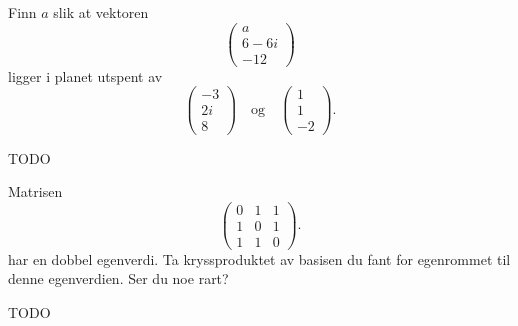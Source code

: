 \begin{oppgave}
Finn $a$ slik at vektoren 
\[
\begin{pmatrix}
a \\ 6-6i \\ -12 
\end{pmatrix}
\]
ligger i planet utspent av 
\[
\begin{pmatrix}
-3 \\ 2i \\ 8 
\end{pmatrix}
\quad 
\text{og}
\quad 
\begin{pmatrix}
1 \\ 1 \\ -2 
\end{pmatrix}.
\]

\end{oppgave}


\begin{losning}
TODO
\end{losning}


\begin{oppgave}
Matrisen
\[
\begin{pmatrix}
0 & 1 & 1 \\ 1 & 0 & 1 \\ 1 & 1 & 0 
\end{pmatrix}.
\]
har en dobbel egenverdi. Ta kryssproduktet av basisen du fant for egenrommet til denne egenverdien. Ser du noe rart?
\end{oppgave}

\begin{losning}
TODO
\end{losning}

